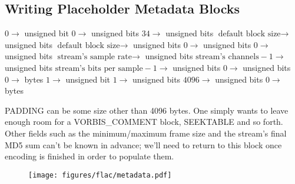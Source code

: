 \clearpage

\subsection{Writing Placeholder Metadata Blocks}
$0 \rightarrow$  unsigned bit
$0 \rightarrow$  unsigned bits
$34 \rightarrow$  unsigned bits
$\text{default block size} \rightarrow$  unsigned bits
$\text{default block size} \rightarrow$  unsigned bits
$0 \rightarrow$  unsigned bits
$0 \rightarrow$  unsigned bits
$\text{stream's sample rate} \rightarrow$  unsigned bits\;
$\text{stream's channels} - 1 \rightarrow$  unsigned bits\;
$\text{stream's bits per sample} - 1 \rightarrow$  unsigned bits\;
$0 \rightarrow$  unsigned bits
$0 \rightarrow$  bytes
\BlankLine
\BlankLine
$1 \rightarrow$  unsigned bit
$1 \rightarrow$  unsigned bits
$4096 \rightarrow$  unsigned bits
$0 \rightarrow$  bytes
\EALGORITHM
\par
\noindent
PADDING can be some size other than 4096 bytes.
One simply wants to leave enough room for a VORBIS\_COMMENT block,
SEEKTABLE and so forth.
Other fields such as the minimum/maximum frame size
and the stream's final MD5 sum can't be known in advance;
we'll need to return to this block once encoding is finished
in order to populate them.
\begin{figure}[h]
\texttt{[image: figures/flac/metadata.pdf]}
\end{figure}


\clearpage

